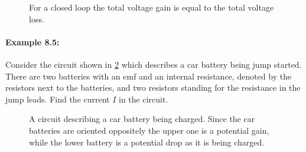 \begin{itemize}
\begin{figure}[ht]
    \centering
    \caption{For a closed loop the total voltage gain is equal to the total voltage loss.}
    \label{fig: voltage rule 3}
\end{figure}
\end{itemize}

\paragraph{Example 8.5:} Consider the circuit shown in \cref{fig: car charging} which describes a car battery being jump started. There are two batteries with an emf and an internal resistance, denoted by the resistors next to the batteries, and two resistors standing for the resistance in the jump leads. Find the current $I$ in the circuit.\\

  \begin{figure}[ht]
    \centering
    \caption{A circuit describing a car battery being charged. Since the car batteries are oriented oppositely the upper one is a potential gain, while the lower battery is a potential drop as it is being charged.}
    \label{fig: car charging}
\end{figure}


